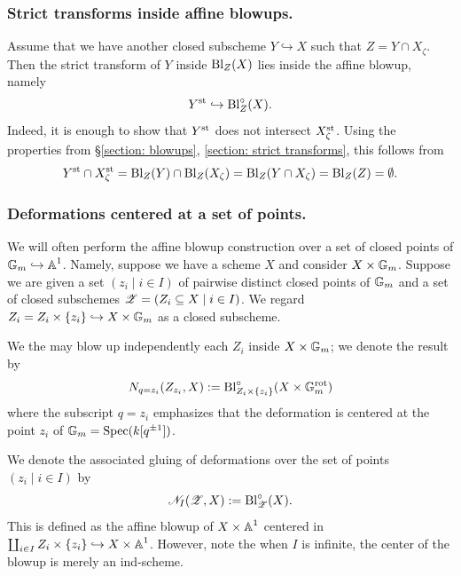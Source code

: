 \subsubsection{Strict transforms inside affine blowups.}\label{section: embedding of strict transform into affine blowup}
Assume that we have another closed subscheme $Y \hookrightarrow X$ such that $Z = Y \cap X_{\zeta}$. Then the strict transform of $Y$ inside $\operatorname{Bl}_Z(X)$ lies inside the affine blowup, namely
\begin{equation*}
    Y^{\mathrm{st}} \hookrightarrow \operatorname{Bl}^{\circ}_{Z}(X).
\end{equation*}
Indeed, it is enough to show that $Y^{\mathrm{st}}$ does not intersect $X^{\mathrm{st}}_{\zeta}$. Using the properties from \S \ref{section: blowups}, \ref{section: strict transforms}, this follows from
\begin{equation*}
  Y^{\mathrm{st}} \cap  X^{\mathrm{st}}_{\zeta} = \operatorname{Bl}_{Z}(Y) \cap \operatorname{Bl}_Z(X_{\zeta}) = \operatorname{Bl}_{Z}(Y \cap X_{\zeta}) = \operatorname{Bl}_{Z}(Z) = \emptyset.
\end{equation*}


\subsubsection{Deformations centered at a set of points.}\label{subsubsection: deformations centered at a set of points}
We will often perform the affine blowup construction over a set of closed points of $\mathbb{G}_m \hookrightarrow \operatorname{\mathbb{A}}^1$. Namely, suppose we have a scheme $X$ and consider $X \times \mathbb{G}_m$. Suppose we are given a set $(z_i \mid i \in I)$ of pairwise distinct closed points of $\mathbb{G}_m$ and a set of closed subschemes $\operatorname{\mathscr{Z}} = (Z_i \subseteq X \mid i \in I)$. We regard $Z_i = Z_i \times \{z_ i\} \hookrightarrow X \times \mathbb{G}_m$ as a closed subscheme.

We the may blow up independently each $Z_i$ inside $X \times \mathbb{G}_m$; we denote the result by
\begin{equation*}
    N_{q=z_i}(Z_{z_i}, X) := \operatorname{Bl}^{\circ}_{Z_{i} \times \{z_i\}}(X \times \mathbb{G}_m^{\mathrm{rot}})
\end{equation*}
where the subscript $q=z_i$ emphasizes that the deformation is centered at the point $z_i$ of $\mathbb{G}_m = \operatorname{Spec}(k[q^{\pm 1}])$. 

We denote the associated gluing of deformations over the set of points $(z_i \mid i \in I)$ by
\begin{equation*}
    \mathscr{N}_{I}(\operatorname{\mathscr{Z}}, X) := \operatorname{Bl}^{\circ}_{\operatorname{\mathscr{Z}}}(X).
\end{equation*}
This is defined as the affine blowup of $X \times \operatorname{\mathbb{A}}^1$ centered in $\coprod_{i \in I} Z_{i} \times \{z_i\} \hookrightarrow X \times \operatorname{\mathbb{A}}^1$. However, note the when $I$ is infinite, the center of the blowup is merely an ind-scheme. 

